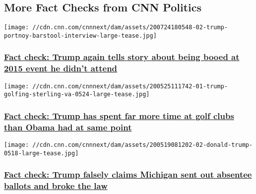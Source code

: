 \hypertarget{more-fact-checks-from-cnn-politics-}{%
\subsection{More Fact Checks from CNN
Politics~}\label{more-fact-checks-from-cnn-politics-}}

\href{/2020/07/24/politics/trump-barstool-interview-robin-hood-booed/index.html}{}

\texttt{[image: //cdn.cnn.com/cnnnext/dam/assets/200724180548-02-trump-portnoy-barstool-interview-large-tease.jpg]}

\hypertarget{fact-check-trump-again-tells-story-about-being-booed-at-2015-event-he-didnt-attend-}{%
\subsubsection{\texorpdfstring{\href{/2020/07/24/politics/trump-barstool-interview-robin-hood-booed/index.html}{Fact
check: Trump again tells story about being booed at 2015 event he didn't
attend
}}{Fact check: Trump again tells story about being booed at 2015 event he didn't attend }}\label{fact-check-trump-again-tells-story-about-being-booed-at-2015-event-he-didnt-attend-}}

\href{/2020/05/25/politics/fact-check-trump-obama-golf/index.html}{}

\texttt{[image: //cdn.cnn.com/cnnnext/dam/assets/200525111742-01-trump-golfing-sterling-va-0524-large-tease.jpg]}

\hypertarget{fact-check-trump-has-spent-far-more-time-at-golf-clubs-than-obama-had-at-same-point}{%
\subsubsection{\texorpdfstring{\href{/2020/05/25/politics/fact-check-trump-obama-golf/index.html}{Fact
check: Trump has spent far more time at golf clubs than Obama had at
same
point}}{Fact check: Trump has spent far more time at golf clubs than Obama had at same point}}\label{fact-check-trump-has-spent-far-more-time-at-golf-clubs-than-obama-had-at-same-point}}

\href{/2020/05/20/politics/fact-check-trump-michigan-nevada-ballots-voting/index.html}{}

\texttt{[image: //cdn.cnn.com/cnnnext/dam/assets/200519081202-02-donald-trump-0518-large-tease.jpg]}

\hypertarget{fact-check-trump-falsely-claims-michigan-sent-out-absentee-ballots-and-broke-the-law}{%
\subsubsection{\texorpdfstring{\href{/2020/05/20/politics/fact-check-trump-michigan-nevada-ballots-voting/index.html}{Fact
check: Trump falsely claims Michigan sent out absentee ballots and broke
the
law}}{Fact check: Trump falsely claims Michigan sent out absentee ballots and broke the law}}\label{fact-check-trump-falsely-claims-michigan-sent-out-absentee-ballots-and-broke-the-law}}

